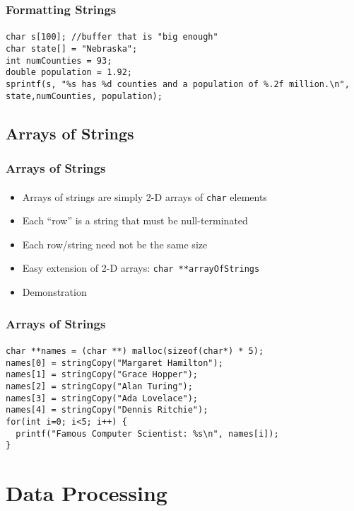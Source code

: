 \documentclass[]{beamer}
\begin{document}
\begin{frame}[fragile]
  \frametitle{Formatting Strings}
  \framesubtitle{}
  
\begin{verbatim}
char s[100]; //buffer that is "big enough"
char state[] = "Nebraska";
int numCounties = 93;
double population = 1.92;
sprintf(s, "%s has %d counties and a population of %.2f million.\n", state,numCounties, population);
\end{verbatim}
    
\end{frame}

\subsection{Arrays of Strings}

\begin{frame}[fragile]
  \frametitle{Arrays of Strings}
  \framesubtitle{}
  
\begin{itemize}[<+->]
  \item Arrays of strings are simply 2-D arrays of \texttt{char} elements
  \item Each ``row'' is a string that must be null-terminated
  \item Each row/string need not be the same size
  \item Easy extension of 2-D arrays: \texttt{char **arrayOfStrings}
  \item Demonstration
\end{itemize}
    
\end{frame}

\begin{frame}[fragile]
  \frametitle{Arrays of Strings}
  \framesubtitle{}
  
\begin{verbatim}
char **names = (char **) malloc(sizeof(char*) * 5);
names[0] = stringCopy("Margaret Hamilton");
names[1] = stringCopy("Grace Hopper");
names[2] = stringCopy("Alan Turing");
names[3] = stringCopy("Ada Lovelace");
names[4] = stringCopy("Dennis Ritchie");
for(int i=0; i<5; i++) {
  printf("Famous Computer Scientist: %s\n", names[i]);
}
\end{verbatim}
    
\end{frame}

\section{Data Processing}
\end{document}
